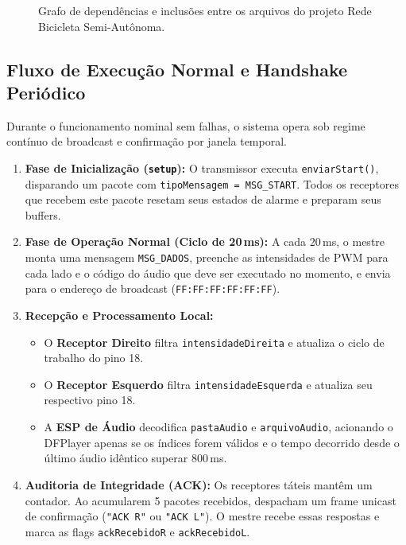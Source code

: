 \documentclass[12pt,a4paper]{article}
\begin{document}
\begin{figure}[H]
{%
    }
    \caption{Grafo de dependências e inclusões entre os arquivos do projeto Rede Bicicleta Semi-Autônoma.}
    \label{fig:arvore_inclusoes}
\end{figure}

\subsection{Fluxo de Execução Normal e Handshake Periódico}
Durante o funcionamento nominal sem falhas, o sistema opera sob regime contínuo de broadcast e confirmação por janela temporal.
\begin{enumerate}
    \item \textbf{Fase de Inicialização (\texttt{setup}):} O transmissor executa \texttt{enviarStart()}, disparando um pacote com \texttt{tipoMensagem = MSG\_START}. Todos os receptores que recebem este pacote resetam seus estados de alarme e preparam seus buffers.
    \item \textbf{Fase de Operação Normal (Ciclo de 20\,ms):} A cada 20\,ms, o mestre monta uma mensagem \texttt{MSG\_DADOS}, preenche as intensidades de PWM para cada lado e o código do áudio que deve ser executado no momento, e envia para o endereço de broadcast (\texttt{FF:FF:FF:FF:FF:FF}).
    \item \textbf{Recepção e Processamento Local:}
    \begin{itemize}
        \item O \textbf{Receptor Direito} filtra \texttt{intensidadeDireita} e atualiza o ciclo de trabalho do pino 18.
        \item O \textbf{Receptor Esquerdo} filtra \texttt{intensidadeEsquerda} e atualiza seu respectivo pino 18.
        \item A \textbf{ESP de Áudio} decodifica \texttt{pastaAudio} e \texttt{arquivoAudio}, acionando o DFPlayer apenas se os índices forem válidos e o tempo decorrido desde o último áudio idêntico superar 800\,ms.
    \end{itemize}
    \item \textbf{Auditoria de Integridade (ACK):} Os receptores táteis mantêm um contador. Ao acumularem 5 pacotes recebidos, despacham um frame unicast de confirmação (\texttt{"ACK R"} ou \texttt{"ACK L"}). O mestre recebe essas respostas e marca as flags \texttt{ackRecebidoR} e \texttt{ackRecebidoL}.
\end{enumerate}
\end{document}
